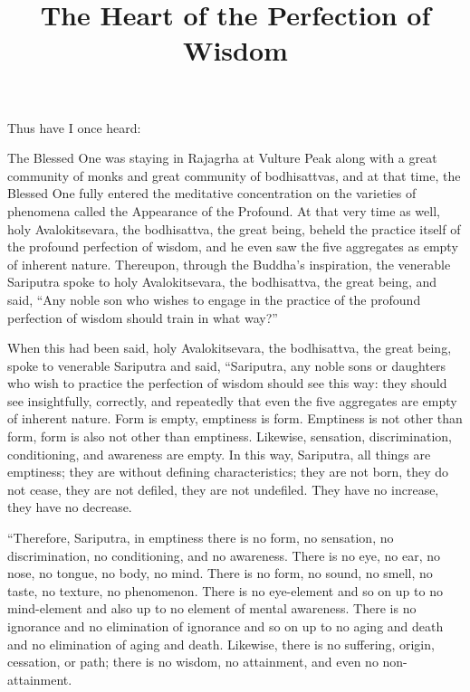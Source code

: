 \documentclass[10pt]{article}
\date{}
\begin{document}
\title{\vspace{-2cm}The Heart of the Perfection of Wisdom}
\maketitle

\thispagestyle{empty}


Thus have I once heard:

The Blessed One was staying in Rajagrha at Vulture Peak along with a great community of monks and great community of bodhisattvas, and at that time, the Blessed One fully entered the meditative concentration on the varieties of phenomena called the Appearance of the Profound. At that very time as well, holy Avalokitsevara, the bodhisattva, the great being, beheld the practice itself of the profound perfection of wisdom, and he even saw the five aggregates as empty of inherent nature. Thereupon, through the Buddha's inspiration, the venerable Sariputra spoke to holy Avalokitsevara, the bodhisattva, the great being, and said, ``Any noble son who wishes to engage in the practice of the profound perfection of wisdom should train in what way?''

When this had been said, holy Avalokitsevara, the bodhisattva, the great being, spoke to venerable Sariputra and said, ``Sariputra, any noble sons or daughters who wish to practice the perfection of wisdom should see this way: they should see insightfully, correctly, and repeatedly that even the five aggregates are empty of inherent nature. Form is empty, emptiness is form. Emptiness is not other than form, form is also not other than emptiness. Likewise, sensation, discrimination, conditioning, and awareness are empty. In this way, Sariputra, all things are emptiness; they are without defining characteristics; they are not born, they do not cease, they are not defiled, they are not undefiled. They have no increase, they have no decrease.

``Therefore, Sariputra, in emptiness there is no form, no sensation, no discrimination, no conditioning, and no awareness. There is no eye, no ear, no nose, no tongue, no body, no mind. There is no form, no sound, no smell, no taste, no texture, no phenomenon. There is no eye-element and so on up to no mind-element and also up to no element of mental awareness. There is no ignorance and no elimination of ignorance and so on up to no aging and death and no elimination of aging and death. Likewise, there is no suffering, origin, cessation, or path; there is no wisdom, no attainment, and even no non-attainment.
\end{document}
